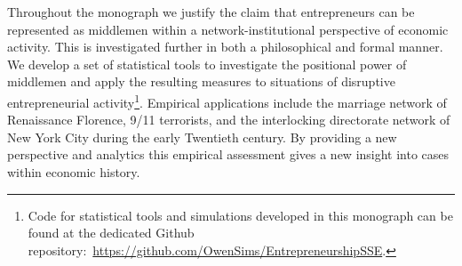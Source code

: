 \documentclass[11pt,fleqn]{book}
\begin{document}
\begin{singlespace}
Throughout the monograph we justify the claim that entrepreneurs can be represented as middlemen within a network-institutional perspective of economic activity. This is investigated further in both a philosophical and formal manner. We develop a set of statistical tools to investigate the positional power of middlemen and apply the resulting measures to situations of disruptive entrepreneurial activity\footnote{Code for statistical tools and simulations developed in this monograph can be found at the dedicated Github repository:~\href{https://github.com/OwenSims/EntrepreneurshipSSE}{https://github.com/OwenSims/EntrepreneurshipSSE}.}. Empirical applications include the marriage network of Renaissance Florence, 9/11 terrorists, and the interlocking directorate network of New York City during the early Twentieth century. By providing a new perspective and analytics this empirical assessment gives a new insight into cases within economic history.

\end{singlespace}

\newpage
\mbox{}
\thispagestyle{empty}
\newpage
















\singlespace





\end{document}
